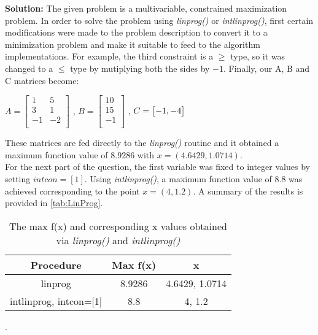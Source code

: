 \documentclass{article}
\begin{document}
\textbf{Solution:}
The given problem is a multivariable, constrained maximization problem. In order to solve the problem using \textit{linprog()} or \textit{intlinprog()}, first certain modifications were made to the problem description to convert it to a minimization problem and make it suitable to feed to the algorithm implementations. For example, the third constraint is a $\geq$ type, so it was changed to a $\leq$ type by mutiplying both the sides by $-1$. Finally, our A, B and C matrices become:

$A = \begin{bmatrix}1 & 5\\ 3 & 1\\ -1 & -2\\\end{bmatrix}$
, $B = \begin{bmatrix}10\\ 15\\ -1\\\end{bmatrix}$
, $C = \begin{bmatrix}-1, -4\\\end{bmatrix}\\$

These matrices are fed directly to the \textit{linprog()} routine and it obtained a maximum function value of $8.9286$ with $x=(4.6429, 1.0714)$.\\

For the next part of the question, the first variable was fixed to integer values by setting $intcon=[1]$. Using \textit{intlinprog()}, a maximum function value of $8.8$ was achieved corresponding to the point $x=(4, 1.2)$. A summary of the results is provided in \autoref{tab:LinProg}.\\

\begin{table}[H]
    \centering
    \begin{tabular}{|c|c|c|}
    \hline
        \textbf{Procedure} & \textbf{Max f(x)} & \textbf{x} \\ \hline
        linprog & 8.9286 & 4.6429, 1.0714 \\ \hline
        intlinprog, intcon=[1] & 8.8 & 4, 1.2 \\ \hline
    \end{tabular}
    \caption{The max f(x) and corresponding x values obtained via \textit{linprog()} and \textit{intlinprog()}}.
    \label{tab:LinProg}
\end{table}
\end{document}
